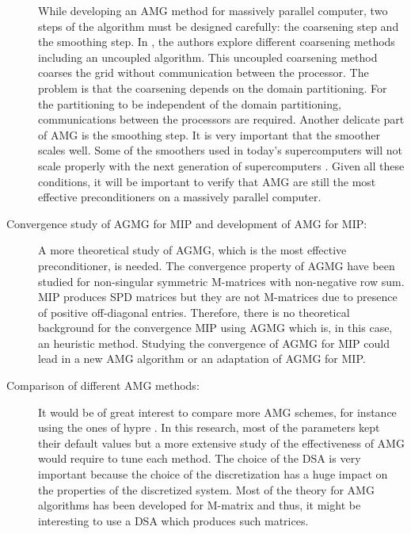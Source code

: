 \begin{description}
    While developing an AMG method for massively parallel computer, two steps
    of the algorithm must be designed carefully: the coarsening step and the
    smoothing step. In \cite{mis}, the authors explore different coarsening
    methods including an uncoupled algorithm. This uncoupled coarsening method
    coarses the grid without communication between the processor. The problem
    is that the coarsening depends on the domain partitioning. For the
    partitioning to be independent of the domain partitioning, communications
    between the processors are required. Another delicate part of AMG is the
    smoothing step. It is very important that the smoother scales well. Some
    of the smoothers used in today's supercomputers will not scale properly
    with the next generation of supercomputers \cite{amg_parallel}. Given all
    these conditions, it will be important to verify that AMG are still the
    most effective preconditioners on a massively parallel computer.
  \item[Convergence study of AGMG for MIP and development of AMG for MIP:] A 
    more theoretical study of AGMG, which is the most effective preconditioner, 
    is needed. The convergence property of AGMG have been studied for non-singular 
    symmetric M-matrices with non-negative row sum. MIP produces SPD matrices
    but they are not M-matrices due to presence of positive off-diagonal
    entries. Therefore, there is no theoretical background for the convergence 
    MIP using AGMG which is, in this case, an heuristic method. Studying the 
    convergence of AGMG for MIP could lead in a new AMG algorithm or an adaptation 
    of AGMG for MIP.
  \item[Comparison of different AMG methods:] It would be of great interest 
    to compare more AMG schemes, for instance using the ones of hypre 
    \cite{hypre_guide}. In this research, most of the parameters kept their 
    default values but a more extensive study of the effectiveness of AMG 
    would require to tune each method. The choice of the DSA is very important 
    because the choice of the discretization has a huge impact on the properties 
    of the discretized system. Most of the theory for AMG algorithms has been 
    developed for M-matrix and thus, it might be interesting to use a DSA
    which produces such matrices.
\end{description}
